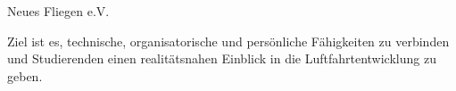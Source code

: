\begin{initiativkarte}{Neues Fliegen e.V.}
  \vspace{0.5cm}

  Ziel ist es, technische, organisatorische und persönliche Fähigkeiten zu verbinden und Studierenden einen realitätsnahen Einblick in die Luftfahrtentwicklung zu geben.

  \vspace{0.5cm}


  \vspace{0.6cm}
  \hawrule


\end{initiativkarte}